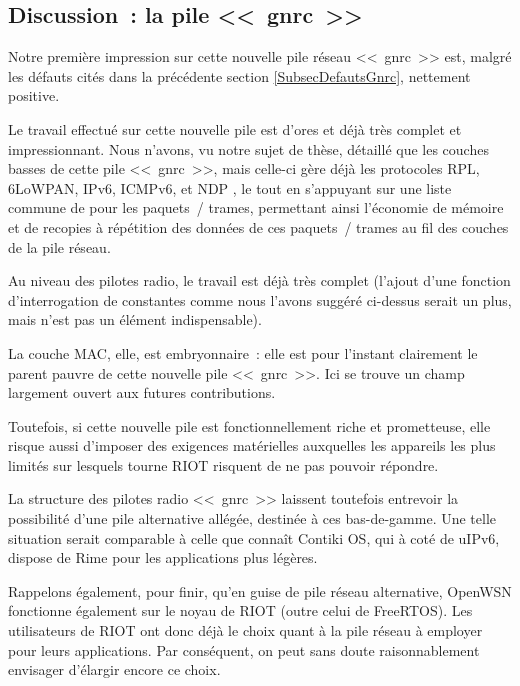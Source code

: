 \subsection{Discussion~: la pile <<~gnrc~>>}
\label{SubsecDiscussGnrc}

Notre première impression sur cette nouvelle pile réseau <<~gnrc~>> est,
malgré les défauts cités dans la précédente section \ref{SubsecDefautsGnrc},
nettement positive.

Le travail effectué sur cette nouvelle pile est d'ores et déjà très complet
et impressionnant. Nous n'avons, vu notre sujet de thèse, détaillé que les
couches basses de cette pile <<~gnrc~>>, mais celle-ci gère déjà les
protocoles RPL, 6LoWPAN, IPv6, ICMPv6, et NDP \cite{NDP}, le tout en
s'appuyant sur une liste commune de  pour les paquets~/
trames, permettant ainsi l'économie de mémoire et de recopies à répétition
des données de ces paquets~/ trames au fil des couches de la pile réseau.

Au niveau des pilotes radio, le travail est déjà très complet (l'ajout
d'une fonction d'interrogation de constantes comme nous l'avons suggéré
ci-dessus serait un plus, mais n'est pas un élément indispensable).

La couche MAC, elle, est embryonnaire~: elle est pour l'instant clairement
le parent pauvre de cette nouvelle pile <<~gnrc~>>. Ici se trouve un champ
largement ouvert aux futures contributions.

\medskip

Toutefois, si cette nouvelle pile est fonctionnellement riche et
prometteuse, elle risque aussi d'imposer des exigences matérielles
auxquelles les appareils les plus limités sur lesquels tourne RIOT
risquent de ne pas pouvoir répondre.

La structure des pilotes radio <<~gnrc~>> laissent toutefois entrevoir
la possibilité d'une pile alternative allégée, destinée à ces 
bas-de-gamme. Une telle situation serait comparable à celle que connaît
Contiki OS, qui à coté de uIPv6, dispose de Rime pour les applications
plus légères.

Rappelons également, pour finir, qu'en guise de pile réseau alternative,
OpenWSN fonctionne également sur le noyau de RIOT (outre celui de FreeRTOS).
Les utilisateurs de RIOT ont donc déjà le choix quant à la pile réseau à
employer pour leurs applications. Par conséquent, on peut sans doute
raisonnablement envisager d'élargir encore ce choix.


